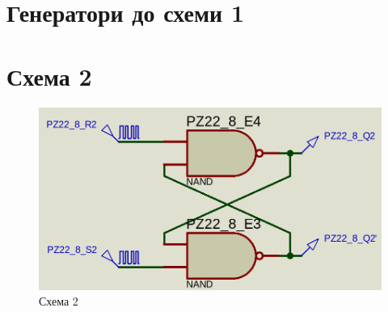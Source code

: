 \documentclass{article}
\begin{document}
\begin{normalsize}
	\section*{Генератори до схеми 1}
	\begin{figure}[H]
		\centering
		\hspace{5px}
	\end{figure}

	\section*{Схема 2}	
	\begin{figure}[H]
		\centering
		\includegraphics[scale=0.25]{s2}	
		\caption{Схема 2}
	\end{figure}
	

\end{normalsize}
\end{document}
